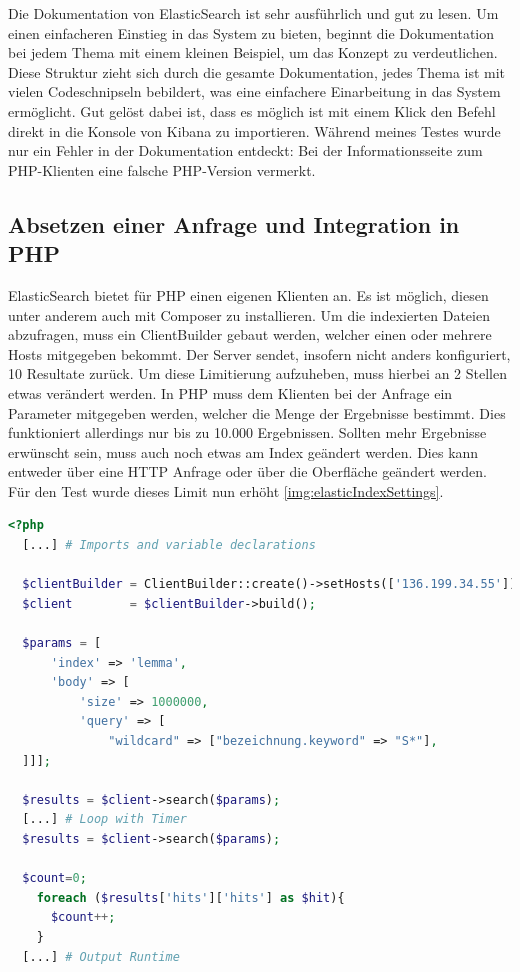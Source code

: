 Die Dokumentation von ElasticSearch ist sehr ausführlich und gut zu lesen. Um einen einfacheren Einstieg in das System zu bieten, beginnt die Dokumentation bei jedem Thema mit einem kleinen Beispiel, um das Konzept zu verdeutlichen. Diese Struktur zieht sich durch die gesamte Dokumentation, jedes Thema ist mit vielen Codeschnipseln bebildert, was eine einfachere Einarbeitung in das System ermöglicht. 
Gut gelöst dabei ist, dass es möglich ist mit einem Klick den Befehl direkt in die Konsole von Kibana zu importieren. Während meines Testes wurde nur ein Fehler in der Dokumentation entdeckt: Bei der Informationsseite zum PHP-Klienten eine falsche PHP-Version vermerkt.

\subsection{Absetzen einer Anfrage und Integration in PHP}

ElasticSearch bietet für PHP einen eigenen Klienten an. Es ist möglich, diesen unter anderem auch mit Composer zu installieren. Um die indexierten Dateien abzufragen, muss ein ClientBuilder gebaut werden, welcher einen oder mehrere Hosts mitgegeben bekommt. Der Server sendet, insofern nicht anders konfiguriert, 10 Resultate zurück. Um diese Limitierung aufzuheben, muss hierbei an 2 Stellen etwas verändert werden. In PHP muss dem Klienten bei der Anfrage ein Parameter mitgegeben werden, welcher die Menge der Ergebnisse bestimmt. Dies funktioniert allerdings nur bis zu 10.000 Ergebnissen. Sollten mehr Ergebnisse erwünscht sein, muss auch noch etwas am Index geändert werden. Dies kann entweder über eine HTTP Anfrage oder über die Oberfläche geändert werden. Für den Test wurde dieses Limit nun erhöht \ref{img:elasticIndexSettings}. 


\begin{lstlisting}[language=php, frame=single, label={lst:phpElastic}, 
  morekeywords={type,uninvertible,indexed,stored,field,multiValued, name}] 
  <?php
  [...] # Imports and variable declarations

  $clientBuilder = ClientBuilder::create()->setHosts(['136.199.34.55']);
  $client        = $clientBuilder->build();

  $params = [
      'index' => 'lemma',
      'body' => [
          'size' => 1000000,
          'query' => [
              "wildcard" => ["bezeichnung.keyword" => "S*"],
  ]]];
  
  $results = $client->search($params);
  [...] # Loop with Timer  
  $results = $client->search($params);

  $count=0;
    foreach ($results['hits']['hits'] as $hit){
      $count++;
    }
  [...] # Output Runtime
  
\end{lstlisting}

